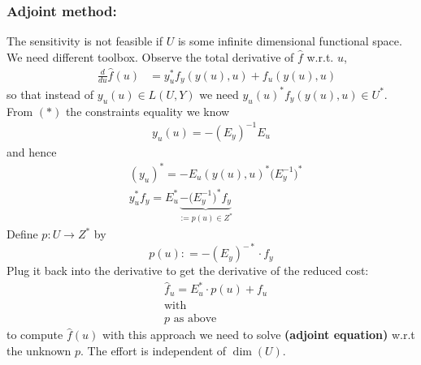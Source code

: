 \subsubsection{Adjoint method:} 
The sensitivity is not feasible if $U$ is some infinite dimensional functional space. We need different toolbox. 
	Observe the total derivative of $\hat{f}$ w.r.t. $u$, 
	\begin{align*}
		 \quad \frac{d}{du} \hat{f}(u) &= y_u^* f_y(y(u), u) + f_u(y(u), u)
	\end{align*}
	so that instead of $y_u(u) \in L(U, Y)$ we  need $y_u(u)^* f_y(y(u), u) \in U^*$. \\
	From $(*)$ the constraints equality we know
	\begin{align*}
		y_u(u) = -(E_y)^{-1} E_u
	\end{align*}
	and hence
	\begin{align*}
		&(y_u)^* = -E_u(y(u), u)^* \bigg(E_y^{-1}\bigg)^*\\
		&y_u^* f_y = E_u^* \underbrace{ -\bigg(E_y^{-1}\bigg)^*f_y }_{:= p(u) \in Z^*}
	\end{align*}
	Define $p: U \rightarrow  Z^*$ by
	\begin{equation}
		p(u): = -(E_y)^{-*} \cdot f_y
	\end{equation}
	Plug it back into the derivative to get the derivative of the reduced cost:
	\begin{equation}
	\begin{aligned}
		&\hat{f}_u = E_u^* \cdot  p(u) + f_u \\
		& \text{with}\\
		& p \text{ as above}
	\end{aligned}
	\end{equation}
	to compute $\hat{f}(u)$ with this approach we need to solve \textbf{(adjoint equation)} w.r.t the unknown $p$. The effort is independent of $\dim(U)$.

